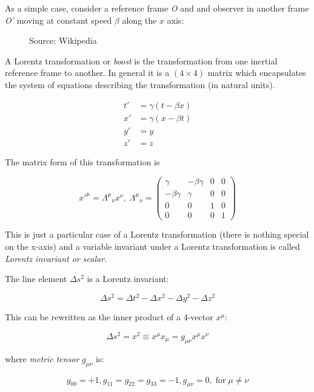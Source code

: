 \documentclass[
  letterpaper,
  DIV=11,
  numbers=noendperiod]{scrreprt}
\begin{document}
As a simple case, consider a reference frame \emph{O} and and observer
in another frame \emph{O'} moving at constant speed \(\beta\) along the
\(x\) axis:

\begin{figure}[H]

{\centering 

}

\caption{Source: Wikipedia}

\end{figure}%

A Lorentz transformation or \emph{boost} is the transformation from one
inertial reference frame to another. In general it is a \((4\times4)\)
matrix which encapsulates the system of equations describing the
transformation (in natural units).

\[\begin{aligned}
t' &= \gamma(t - \beta x) \\
x' &= \gamma(x - \beta t) \\
y' &= y \\
z' &= z
\end{aligned}\]

The matrix form of this transformation is

\[x'^\mu = {\Lambda^\mu}_\nu x^\nu, \; {\Lambda^\mu}_\nu =
\begin{pmatrix}
\gamma & -\beta\gamma & 0 & 0 \\
-\beta\gamma & \gamma & 0 & 0 \\
0 & 0 & 1 & 0 \\
0 & 0 & 0 & 1
\end{pmatrix}\]

This is just a particular case of a Lorentz transformation (there is
nothing special on the x-axis) and a variable invariant under a Lorentz
transformation is called \emph{Lorentz invariant or scalar}.

The line element \(\Delta s^2\) is a Lorentz invariant:

\[\Delta s^2 = \Delta t^2 - \Delta x^2 - \Delta y^2 -\Delta z^2 \]

This can be rewritten as the inner product of a 4-vector \(x^{\mu}\):

\[\Delta s^2 = x^2 \equiv x^\mu x_\mu = g_{\mu\nu} x^\mu x^\nu\]

where \emph{metric tensor} \(g_{\mu\nu}\) is:

\[g_{00} = + 1, g_{11} = g_{22} = g_{33} = - 1 , g_{\mu\nu} = 0, \;\mathrm{ for}\; \mu \neq\nu\]
\end{document}
